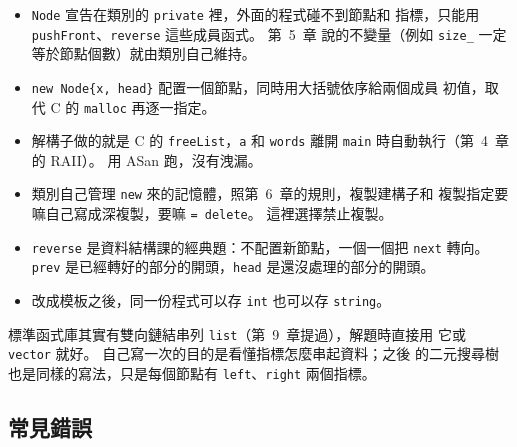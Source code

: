 \begin{itemize}
\item \texttt{Node} 宣告在類別的 \texttt{private} 裡，外面的程式碰不到節點和
指標，只能用 \texttt{pushFront}、\texttt{reverse} 這些成員函式。 第~5~章
說的不變量（例如 \texttt{size\_} 一定等於節點個數）就由類別自己維持。
\item \texttt{new Node\{x, head\}} 配置一個節點，同時用大括號依序給兩個成員
初值，取代 C 的 \texttt{malloc} 再逐一指定。
\item 解構子做的就是 C 的 \texttt{freeList}，\texttt{a} 和 \texttt{words}
離開 \texttt{main} 時自動執行（第~4~章的 RAII）。 用 ASan 跑，沒有洩漏。
\item 類別自己管理 \texttt{new} 來的記憶體，照第~6~章的規則，複製建構子和
複製指定要嘛自己寫成深複製，要嘛 \texttt{= delete}。 這裡選擇禁止複製。
\item \texttt{reverse} 是資料結構課的經典題：不配置新節點，一個一個把
\texttt{next} 轉向。 \texttt{prev} 是已經轉好的部分的開頭，\texttt{head}
是還沒處理的部分的開頭。
\item 改成模板之後，同一份程式可以存 \texttt{int} 也可以存 \texttt{string}。
\end{itemize}

標準函式庫其實有雙向鏈結串列 \texttt{list}（第~9~章提過），解題時直接用
它或 \texttt{vector} 就好。 自己寫一次的目的是看懂指標怎麼串起資料；之後
的二元搜尋樹也是同樣的寫法，只是每個節點有 \texttt{left}、\texttt{right}
兩個指標。

\subsection{常見錯誤}

